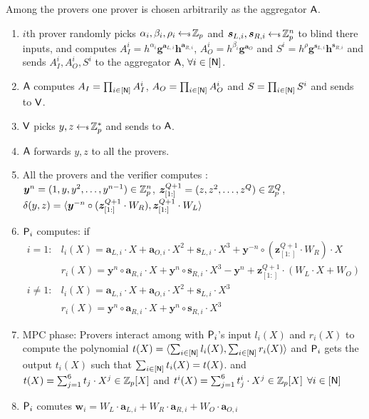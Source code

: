 Among the provers one prover is chosen arbitrarily as the aggregator $\mathsf{A}$.

\begin{enumerate}
	\item $i$th prover randomly picks $\alpha_i, \beta_i, \rho_i \hskip2.3pt{\gets\!\!\mbox{\tiny${\$}$\normalsize}}\, \mathbb{Z}_p$ and $\bm{s}_{L,i}, \bm{s}_{R,i} \hskip2.3pt{\gets\!\!\mbox{\tiny${\$}$\normalsize}}\, \mathbb{Z}_p^n$ to blind there inputs, and computes $A_I^i = h^{\alpha_i}\bm{g}^{\bm{a}_{L,i}}\bm{h}^{\bm{a}_{R,i}}$, $A^i_O = h^{\beta_i}\bm{g}^{\bm{a}_O}$ and $S^i = h^{\rho}\bm{g}^{\bm{s}_{L,i}}\bm{h}^{\bm{s}_{R,i}}$
	and sends $A^i_I, A^i_O, S^i$ to the aggregator $\mathsf{A}$, $\forall i\in [\mathsf{N}]$.
	
	\item $\mathsf{A}$ computes $A_I = \prod_{i \in [\mathsf{N}]} A_I^i$, $A_O = \prod_{i \in [\mathsf{N}]} A_O^i$ and $S = \prod_{i \in [\mathsf{N}]} S^i$ and sends to $\mathsf{V}$.
	
	\item $\mathsf{V}$ picks $y,z \hskip2.3pt{\gets\!\!\mbox{\tiny${\$}$\normalsize}}\, \mathbb{Z}^*_p$ and sends to $\mathsf{A}$.
	
	\item $\mathsf{A}$ forwards $y,z$ to all the provers.
	
	\item All the provers and the verifier computes :\\
	$\bm{y}^n = (1, y, y^2, \ldots, y^{n-1}) \in \mathbb{Z}^n_p$, 
	$\bm{z}^{Q+1}_{[1:]} = (z, z^2, \ldots, z^Q) \in \mathbb{Z}^Q_p$, 
	$\delta(y,z) = \langle \bm{y}^{-n}\circ (\bm{z}^{Q+1}_{[1:]}\cdot W_R),\bm{z}^{Q+1}_{[1:]}\cdot W_L\rangle$\\
	
	\item $\mathsf{P}_i$ computes:
	if 
	\begin{align*}
	i=1 : &l_i(X) = \bm{a}_{L,i}\cdot X + \bm{a}_{O,i} \cdot X^2 + \bm{s}_{L,i} \cdot X^3 + \bm{y}^{-n}\circ (\bm{z}_{[1:]}^{Q+1} \cdot W_R)\cdot X \\
	&r_i(X) = \bm{y}^n\circ \bm{a}_{R,i}\cdot X + \bm{y}^n \circ \bm{s}_{R,i}\cdot X^3 - \bm{y}^n + \bm{z}^{Q+1}_{[1:]} \cdot (W_L\cdot X + W_O)\\
	i \neq 1 : &l_i(X) = \bm{a}_{L,i}\cdot X + \bm{a}_{O,i} \cdot X^2 + \bm{s}_{L,i} \cdot X^3\\
	&r_i(X) = \bm{y}^n\circ \bm{a}_{R,i}\cdot X + \bm{y}^n \circ \bm{s}_{R,i}\cdot X^3
	\end{align*}
	
	\item MPC phase: Provers interact among with $\mathsf{P}_i$'s input $l_i(X)$ and $r_i(X)$ to compute the polynomial $t(X) = \langle \sum_{i \in [\mathsf{N}]}l_i(X),\sum_{i \in [\mathsf{N}]}r_i(X)\rangle$ and $\mathsf{P}_i$ gets the output $t_i(X)$ such that $\sum_{i\in[\mathsf{N}]} t_i(X) = t(X)$.
	and $t(X)= \sum_{j=1}^6 t_j\cdot X^j \in \mathbb{Z}_p[X]$ and $t^i(X)= \sum_{j=1}^6 t^i_j\cdot X^j \in \mathbb{Z}_p[X]$ $\forall i\in [\mathsf{N}]$
	\item $\mathsf{P}_i$ comutes $\bm{w}_i = W_L\cdot \bm{a}_{L,i} + W_R\cdot \bm{a}_{R,i} + W_O\cdot \bm{a}_{O,i}$
	

\end{enumerate}
